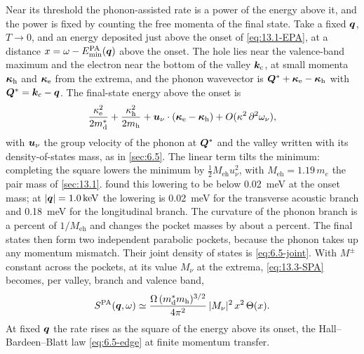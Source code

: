 Near its threshold the phonon-assisted rate is a power of the energy above it, and the power is fixed by counting the free momenta of the final state. Take a fixed $\bm{q}$, $T \to 0$, and an energy deposited just above the onset of \cref{eq:13.1-EPA}, at a distance $x = \omega - E_{\mathrm{min}}^{\mathrm{PA}}(\bm{q})$ above the onset. The hole lies near the valence-band maximum and the electron near the bottom of the valley $\bm{k}_{\mathrm{c}}$, at small momenta $\bm{\kappa}_{\mathrm{h}}$ and $\bm{\kappa}_{\mathrm{e}}$ from the extrema, and the phonon wavevector is $\bm{Q}^* + \bm{\kappa}_{\mathrm{e}} - \bm{\kappa}_{\mathrm{h}}$ with $\bm{Q}^* = \bm{k}_{\mathrm{c}} - \bm{q}$. The final-state energy above the onset is
\begin{equation*}
  \frac{\kappa_{\mathrm{e}}^2}{2m^*_{\mathrm{d}}} + \frac{\kappa_{\mathrm{h}}^2}{2m_{\mathrm{h}}} + \bm{u}_\nu\cdot(\bm{\kappa}_{\mathrm{e}} - \bm{\kappa}_{\mathrm{h}}) + O(\kappa^2\,\partial^2\omega_\nu) ,
\end{equation*}
with $\bm{u}_\nu$ the group velocity of the phonon at $\bm{Q}^*$ and the valley written with its density-of-states mass, as in \cref{sec:6.5}. The linear term tilts the minimum: completing the square lowers the minimum by $\frac12M_{\mathrm{eh}}u_\nu^2$, with $M_{\mathrm{eh}} = 1.19\,m_e$ the pair mass of \cref{sec:13.1}.  found this lowering to be below \SI{0.02}{meV} at the onset mass; at $|\bm{q}| = \SI{1.0}{keV}$ the lowering is \SI{0.02}{meV} for the transverse acoustic branch and \SI{0.18}{meV} for the longitudinal branch. The curvature of the phonon branch is a percent of $1/M_{\mathrm{eh}}$ and changes the pocket masses by about a percent. The final states then form two independent parabolic pockets, because the phonon takes up any momentum mismatch. Their joint density of states is \cref{eq:6.5-joint}. With $M^\pm$ constant across the pockets, at its value $M_\nu$ at the extrema, \cref{eq:13.3-SPA} becomes, per valley, branch and valence band,
\begin{equation}
  S^{\mathrm{PA}}(\bm{q},\omega) \simeq \frac{\Omega\,(m^*_{\mathrm{d}}m_{\mathrm{h}})^{3/2}}{4\pi^2}\,|M_\nu|^2\,x^2\,\Theta(x) .
  \label{eq:13.3-near}
\end{equation}
At fixed $\bm{q}$ the rate rises as the square of the energy above its onset, the Hall--Bardeen--Blatt law \cref{eq:6.5-edge} at finite momentum transfer.


